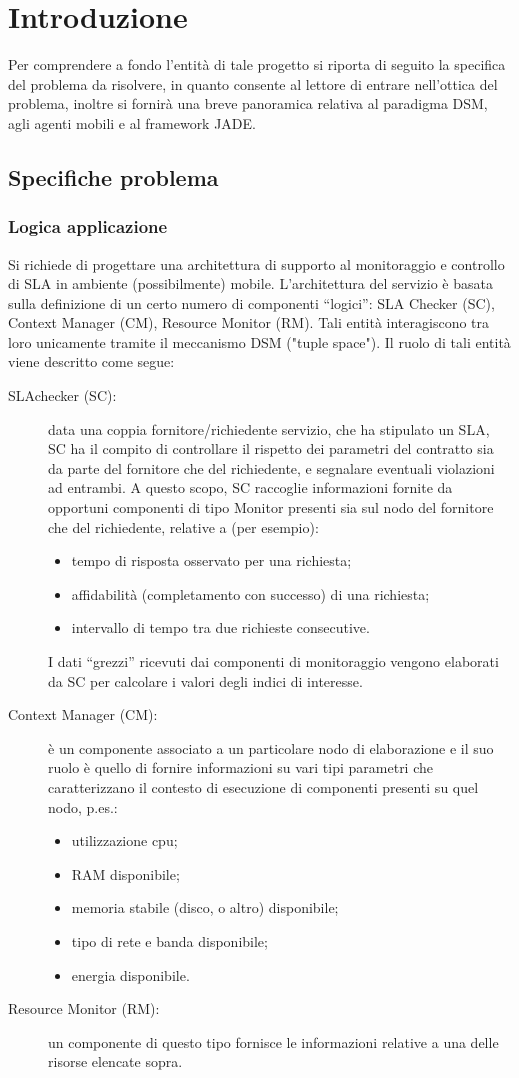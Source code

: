 \chapter{Introduzione}\label{cap:introduzione}
Per comprendere a fondo l'entità di tale progetto si riporta di seguito la specifica del problema da risolvere, in quanto consente al lettore di entrare nell'ottica del problema, inoltre si fornirà una breve panoramica relativa al paradigma DSM, agli agenti mobili e al framework JADE.
\section{Specifiche problema}
\subsection{Logica applicazione}
Si richiede di progettare una architettura di supporto al monitoraggio e controllo di SLA\cite{gino} in ambiente (possibilmente) mobile. L’architettura del servizio è basata sulla definizione di un certo numero di componenti “logici”: SLA Checker (SC), Context Manager (CM), Resource Monitor (RM). Tali entità interagiscono tra loro unicamente tramite il meccanismo DSM ("tuple space"). Il ruolo di tali entità viene descritto come segue:
\begin{description}
\item[SLAchecker (SC):] data una coppia fornitore/richiedente servizio, che ha stipulato un SLA, SC ha il compito di controllare il rispetto dei parametri del contratto sia da parte del fornitore che del richiedente, e segnalare eventuali violazioni ad entrambi. A questo scopo, SC raccoglie informazioni fornite da opportuni componenti di tipo Monitor presenti sia sul nodo del fornitore che del richiedente, relative a (per esempio):
\begin{itemize}
\item tempo di risposta osservato per una richiesta;
\item affidabilità (completamento con successo) di una richiesta;
\item intervallo di tempo tra due richieste consecutive.
\end{itemize}
I dati “grezzi” ricevuti dai componenti di monitoraggio vengono elaborati da SC per calcolare i valori degli indici di interesse.
\item[Context Manager (CM):] è un componente associato a un particolare nodo di elaborazione e il suo ruolo è quello di fornire informazioni su vari tipi parametri che caratterizzano il contesto di esecuzione di componenti presenti su quel nodo, p.es.:
\begin{itemize}
\item utilizzazione cpu;
\item RAM disponibile;
\item memoria stabile (disco, o altro) disponibile;
\item tipo di rete e banda disponibile;
\item energia disponibile.
\end{itemize}
\item[Resource Monitor (RM):] un componente di questo tipo fornisce le informazioni relative a una delle risorse elencate sopra.
\end{description}
